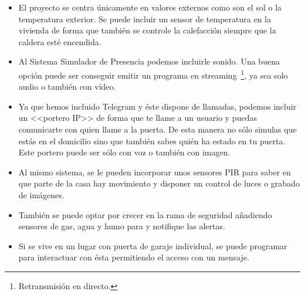 \begin{itemize}
\item El proyecto se centra únicamente en valores externos como son el sol o la temperatura exterior. Se puede incluir un sensor de temperatura en la vivienda de forma que también se controle la calefacción siempre que la caldera esté encendida.

\item Al Sistema Simulador de Presencia podemos incluirle sonido. Una buena opción puede ser conseguir emitir un programa en streaming~\footnote{Retransmisión en directo.}, ya sea solo audio o también con vídeo.

\item Ya que hemos incluido Telegram y éste dispone de llamadas, podemos incluir un <<portero IP>> de forma que te llame a un usuario y puedas comunicarte con quien llame a la puerta. De esta manera no sólo simulas que estás en el domicilio sino que también sabes quién ha estado en tu puerta. Este portero puede ser sólo con voz o también con imagen.

\item Al mismo sistema, se le pueden incorporar unos sensores PIR para saber en que parte de la casa hay movimiento y disponer un control de luces o grabado de imágenes.

\item También se puede optar por crecer en la rama de seguridad añadiendo sensores de gas, agua y humo para y notifique las alertas.

\item Si se vive en un lugar con puerta de garaje individual, se puede programar para interactuar con ésta permitiendo el acceso con un mensaje.

\end{itemize}
